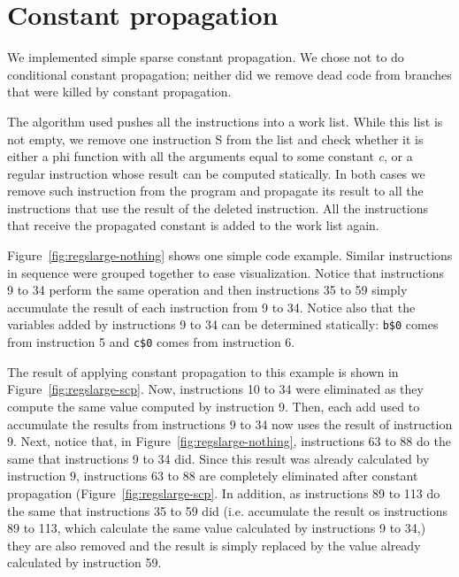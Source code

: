 \documentclass[10pt,twocolumn]{article}
\begin{document}
\section{Constant propagation}

We implemented simple sparse constant propagation. We chose not to do
conditional constant propagation; neither did we remove dead code from
branches that were killed by constant
propagation.

The algorithm used pushes all the instructions into a work list. While
this list is not empty, we remove one instruction S from the list and check
whether it is either a phi function with all the arguments equal to
some constant \emph{c}, or a regular instruction whose result can be computed
statically. In both cases we remove such instruction from the program and
propagate its result to all the instructions that use the result of the deleted
instruction. All the instructions that receive the propagated constant is
added to the work list again.

Figure~\ref{fig:regslarge-nothing} shows one simple code example. Similar instructions
in sequence were grouped together to ease visualization. Notice that
instructions 9 to 34 perform the same operation and then instructions 35 to 59 simply
accumulate the result of each instruction from 9 to 34. Notice also that the variables
added by instructions 9 to 34 can be determined statically: \texttt{b\$0} comes from
instruction 5 and \texttt{c\$0} comes from instruction 6.

The result of applying constant propagation to this example is shown in Figure~\ref{fig:regslarge-scp}.
Now, instructions 10 to 34 were eliminated as they compute the same value computed by instruction 9.
Then, each add used to accumulate the results from instructions 9 to 34 now uses the result of instruction 9.
Next, notice that, in Figure~\ref{fig:regslarge-nothing}, instructions 63 to 88 do the same
that instructions 9 to 34 did. Since this result was already calculated by instruction 9, instructions 63 to 88
are completely eliminated after constant propagation (Figure~\ref{fig:regslarge-scp}. In addition, as instructions
89 to 113 do the same that instructions 35 to 59 did (i.e. accumulate the result os instructions 89 to 113, which calculate the same value calculated
by instructions 9 to 34,) they are also removed and the result is simply replaced by the value already
calculated by instruction 59.
\end{document}
